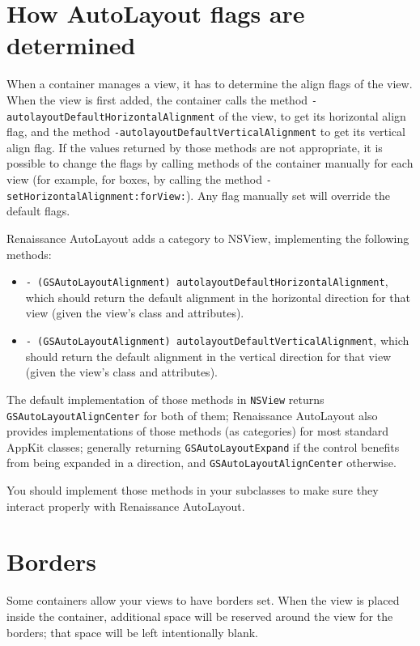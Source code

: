 \section{How AutoLayout flags are determined}
When a container manages a view, it has to determine the align flags
of the view.  When the view is first added, the container calls the
method \texttt{-autolayoutDefaultHorizontalAlignment} of the view, to
get its horizontal align flag, and the method
\texttt{-autolayoutDefaultVerticalAlignment} to get its vertical align
flag.  If the values returned by those methods are not appropriate, it
is possible to change the flags by calling methods of the container
manually for each view (for example, for boxes, by calling the method
\texttt{-setHorizontalAlignment:forView:}).  Any flag manually set will
override the default flags.

Renaissance AutoLayout adds a category to NSView, implementing the
following methods:

\begin{itemize}
\item \texttt{- (GSAutoLayoutAlignment)
  autolayoutDefaultHorizontalAlignment}, which should return the
  default alignment in the horizontal direction for that view (given
  the view's class and attributes).
\item \texttt{- (GSAutoLayoutAlignment)
  autolayoutDefaultVerticalAlignment}, which should return the default
  alignment in the vertical direction for that view (given the view's
  class and attributes).
\end{itemize}

The default implementation of those methods in \texttt{NSView} returns
\texttt{GSAutoLayoutAlignCenter} for both of them; Renaissance AutoLayout 
also provides implementations of those methods (as categories) for
most standard AppKit classes; generally returning
\texttt{GSAutoLayoutExpand} if the control benefits from being expanded 
in a direction, and \texttt{GSAutoLayoutAlignCenter} otherwise.

You should implement those methods in your subclasses to make sure
they interact properly with Renaissance AutoLayout.

\section{Borders}
Some containers allow your views to have borders set.  When the view
is placed inside the container, additional space will be reserved
around the view for the borders; that space will be left intentionally
blank.

